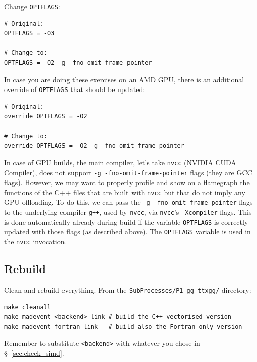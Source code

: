 \documentclass[11pt,a4paper]{article}
\begin{document}
Change \texttt{OPTFLAGS}:
\begin{lstlisting}[style=diffstyle]
# Original:
OPTFLAGS = -O3

# Change to:
OPTFLAGS = -O2 -g -fno-omit-frame-pointer
\end{lstlisting}

\begin{warnbox}
In case you are doing these exercises on an AMD GPU, there is an additional override of \texttt{OPTFLAGS} that should be updated:
\begin{lstlisting}[style=diffstyle]
# Original:
override OPTFLAGS = -O2

# Change to:
override OPTFLAGS = -O2 -g -fno-omit-frame-pointer
\end{lstlisting}
\end{warnbox}

\begin{tipbox}
In case of GPU builds, the main compiler, let's take \texttt{nvcc} (NVIDIA CUDA Compiler), does not support \texttt{-g -fno-omit-frame-pointer} flags (they are GCC flags).
However, we may want to properly profile and show on a flamegraph the functions of the C++ files that are built with \texttt{nvcc} but that do not imply any GPU offloading.
To do this, we can pass the \texttt{-g -fno-omit-frame-pointer} flags to the underlying compiler \texttt{g++}, used by \texttt{nvcc}, via \texttt{nvcc}'s \texttt{-Xcompiler} flags.
This is done automatically already during build if the variable \texttt{OPTFLAGS} is correctly updated with those flags (as described above).
The \texttt{OPTFLAGS} variable is used in the \texttt{nvcc} invocation.
\end{tipbox}

\subsection{Rebuild}

Clean and rebuild everything.
From the \texttt{SubProcesses/P1\_gg\_ttxgg/} directory:

\begin{lstlisting}[style=bashstyle]
make cleanall
make madevent_<backend>_link # build the C++ vectorised version
make madevent_fortran_link   # build also the Fortran-only version
\end{lstlisting}

Remember to substitute \texttt{<backend>} with whatever you chose in \S~\ref{sec:check_simd}.
\end{document}
